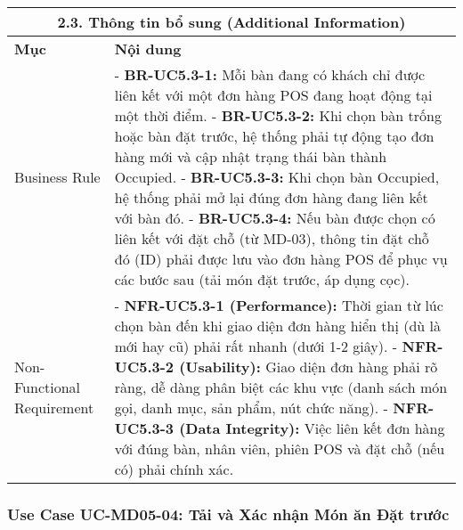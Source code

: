 \begin{longtable}{|m{4cm}|p{11cm}|}
\hline
\multicolumn{2}{|c|}{\textbf{2.3. Thông tin bổ sung (Additional Information)}} \\
\hline
\textbf{Mục} & \textbf{Nội dung} \\
\hline
Business Rule & - \textbf{BR-UC5.3-1:} Mỗi bàn đang có khách chỉ được liên kết với một đơn hàng POS đang hoạt động tại một thời điểm. \newline - \textbf{BR-UC5.3-2:} Khi chọn bàn trống hoặc bàn đặt trước, hệ thống phải tự động tạo đơn hàng mới và cập nhật trạng thái bàn thành Occupied. \newline - \textbf{BR-UC5.3-3:} Khi chọn bàn Occupied, hệ thống phải mở lại đúng đơn hàng đang liên kết với bàn đó. \newline - \textbf{BR-UC5.3-4:} Nếu bàn được chọn có liên kết với đặt chỗ (từ MD-03), thông tin đặt chỗ đó (ID) phải được lưu vào đơn hàng POS để phục vụ các bước sau (tải món đặt trước, áp dụng cọc). \\
\hline
Non-Functional Requirement & - \textbf{NFR-UC5.3-1 (Performance):} Thời gian từ lúc chọn bàn đến khi giao diện đơn hàng hiển thị (dù là mới hay cũ) phải rất nhanh (dưới 1-2 giây). \newline - \textbf{NFR-UC5.3-2 (Usability):} Giao diện đơn hàng phải rõ ràng, dễ dàng phân biệt các khu vực (danh sách món gọi, danh mục, sản phẩm, nút chức năng). \newline - \textbf{NFR-UC5.3-3 (Data Integrity):} Việc liên kết đơn hàng với đúng bàn, nhân viên, phiên POS và đặt chỗ (nếu có) phải chính xác. \\
\hline
\end{longtable}


\subsubsection{Use Case UC-MD05-04: Tải và Xác nhận Món ăn Đặt trước}

